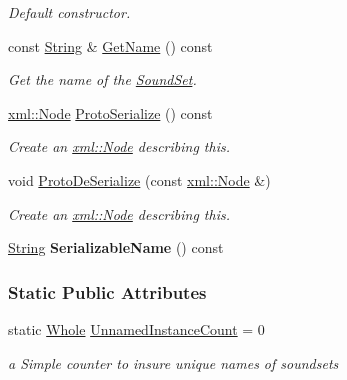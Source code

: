 \begin{DoxyCompactItemize}
\begin{DoxyCompactList}\small\item\em Default constructor. \item\end{DoxyCompactList}\item 
const \hyperlink{namespacephys_aa03900411993de7fbfec4789bc1d392e}{String} \& \hyperlink{classphys_1_1SoundSet_aa26c72befe51f514b24b652932ad1bc9}{GetName} () const 
\begin{DoxyCompactList}\small\item\em Get the name of the \hyperlink{classphys_1_1SoundSet}{SoundSet}. \item\end{DoxyCompactList}\item 
\hyperlink{classphys_1_1xml_1_1Node}{xml::Node} \hyperlink{classphys_1_1SoundSet_ab8202b748768b338505928cdece9d08c}{ProtoSerialize} () const 
\begin{DoxyCompactList}\small\item\em Create an \hyperlink{classphys_1_1xml_1_1Node}{xml::Node} describing this. \item\end{DoxyCompactList}\item 
void \hyperlink{classphys_1_1SoundSet_a5734b8cf5370036fea6d41b6659eca8e}{ProtoDeSerialize} (const \hyperlink{classphys_1_1xml_1_1Node}{xml::Node} \&)
\begin{DoxyCompactList}\small\item\em Create an \hyperlink{classphys_1_1xml_1_1Node}{xml::Node} describing this. \item\end{DoxyCompactList}\item 
\hypertarget{classphys_1_1SoundSet_a3cda7016b61a7da7f0c42e0bcc76d809}{
\hyperlink{namespacephys_aa03900411993de7fbfec4789bc1d392e}{String} {\bfseries SerializableName} () const }
\label{classphys_1_1SoundSet_a3cda7016b61a7da7f0c42e0bcc76d809}

\end{DoxyCompactItemize}
\subsubsection*{Static Public Attributes}
\begin{DoxyCompactItemize}
\item 
\hypertarget{classphys_1_1SoundSet_aaa6e07be3d7ce9b9b8b3dd86e8ca95e9}{
static \hyperlink{namespacephys_a460f6bc24c8dd347b05e0366ae34f34a}{Whole} \hyperlink{classphys_1_1SoundSet_aaa6e07be3d7ce9b9b8b3dd86e8ca95e9}{UnnamedInstanceCount} = 0}
\label{classphys_1_1SoundSet_aaa6e07be3d7ce9b9b8b3dd86e8ca95e9}

\begin{DoxyCompactList}\small\item\em a Simple counter to insure unique names of soundsets \item\end{DoxyCompactList}\end{DoxyCompactItemize}


